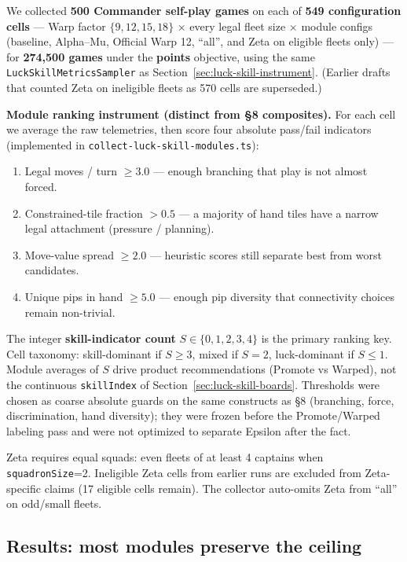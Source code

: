 \documentclass[11pt,letterpaper]{article}
\begin{document}
We collected \textbf{500 Commander self-play games} on each of \textbf{549 configuration cells} --- Warp factor $\{9,12,15,18\}$ $\times$ every legal fleet size $\times$ module configs (baseline, Alpha--Mu, Official Warp 12, ``all'', and Zeta on eligible fleets only) --- for \textbf{274{,}500 games} under the \textbf{points} objective, using the same \texttt{LuckSkillMetricsSampler} as Section~\ref{sec:luck-skill-instrument}. (Earlier drafts that counted Zeta on ineligible fleets as 570 cells are superseded.)

\textbf{Module ranking instrument (distinct from §8 composites).}
For each cell we average the raw telemetries, then score four absolute pass/fail indicators (implemented in \texttt{collect-luck-skill-modules.ts}):

\begin{enumerate}
\item Legal moves / turn $\geq 3.0$ --- enough branching that play is not almost forced.
\item Constrained-tile fraction $> 0.5$ --- a majority of hand tiles have a narrow legal attachment (pressure / planning).
\item Move-value spread $\geq 2.0$ --- heuristic scores still separate best from worst candidates.
\item Unique pips in hand $\geq 5.0$ --- enough pip diversity that connectivity choices remain non-trivial.
\end{enumerate}

The integer \textbf{skill-indicator count} $S \in \{0,1,2,3,4\}$ is the primary ranking key. Cell taxonomy: skill-dominant if $S \geq 3$, mixed if $S = 2$, luck-dominant if $S \leq 1$. Module averages of $S$ drive product recommendations (Promote vs Warped), not the continuous \texttt{skillIndex} of Section~\ref{sec:luck-skill-boards}. Thresholds were chosen as coarse absolute guards on the same constructs as §8 (branching, force, discrimination, hand diversity); they were frozen before the Promote/Warped labeling pass and were not optimized to separate Epsilon after the fact.

Zeta requires equal squads: even fleets of at least 4 captains when \texttt{squadronSize}=2. Ineligible Zeta cells from earlier runs are excluded from Zeta-specific claims (17 eligible cells remain). The collector auto-omits Zeta from ``all'' on odd/small fleets.

\subsection{Results: most modules preserve the ceiling}

\end{document}
